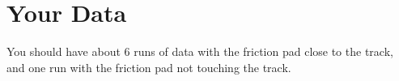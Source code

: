 \section{Your Data}
%
You should have about 6 runs of data with the friction pad close to the track, and one run with the friction pad not touching the track.
%
%
